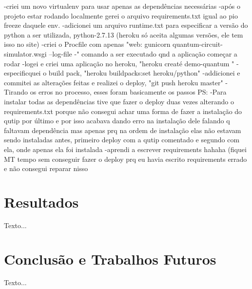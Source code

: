 \documentclass[a4paper, 12pt, oneside]{book}
\begin{document}
-criei um novo virtualenv para usar apenas as dependências necessárias
-após o projeto estar rodando localmente gerei o arquivo requirements.txt igual ao pio freeze daquele env.
-adicionei um arquivo runtime.txt para especificar a versão do python a ser utilizada, python-2.7.13 (heroku só aceita algumas versões, ele tem isso no site)
-criei o Procfile com apenas "web: gunicorn quantum-circuit-simulator.wsgi --log-file -" comando a ser executado qnd a aplicação começar a rodar
-logei e criei uma aplicação no heroku, "heroku creaté demo-quantum "
-especificquei o build pack, "heroku buildpacks:set heroku/python"
-addicionei e commitei as alterações feitas e realizei o deploy, "git push heroku master"
-Tirando os erros no processo, esses foram basicamente os passos
PS:
-Para instalar todas as dependências tive que fazer o deploy duas vezes alterando o requirements.txt porque não consegui achar uma forma de fazer a instalação do qutip por último e por isso acabava dando erro na instalação dele falando q faltavam dependência mas apenas prq na ordem de instalação elas não estavam sendo instaladas antes, primeiro deploy com a qutip comentado e segundo com ela, onde apenas ela foi instalada
-aprendi a escrever requirements hahaha (fiquei MT tempo sem conseguir fazer o deploy prq eu havia escrito requirements errado e não consegui reparar nisso


\chapter{Resultados}
\thispagestyle{empty} 

Texto...

\chapter{Conclusão e Trabalhos Futuros}
\thispagestyle{empty} 

Texto...



\end{document}
